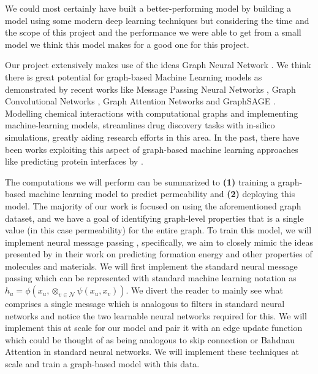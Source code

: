 \documentclass[fontsize=11pt]{article}
\begin{document}
We could most certainly have built a better-performing model by building a model using some modern deep learning techniques but considering the time and the scope of this project and the performance we were able to get from a small model we think this model makes for a good one for this project.



Our project extensively makes use of the ideas Graph Neural Network \citep{4700287}. We think there is great potential for graph-based Machine Learning models as demonstrated by recent works like Message Passing Neural Networks \citep{gilmer2017neural}, Graph Convolutional Networks \citep{https://doi.org/10.48550/arxiv.1609.02907}, Graph Attention Networks \citep{https://doi.org/10.48550/arxiv.1710.10903} and GraphSAGE \citep{hamilton2017inductive}. Modelling chemical interactions with computational graphs and implementing machine-learning models, streamlines drug discovery tasks with in-silico simulations, greatly aiding research efforts in this area. In the past, there have been works exploiting this aspect of graph-based machine learning approaches like predicting protein interfaces by \cite{fout2017protein}.

The computations we will perform can be summarized to \textbf{(1)} training a graph-based machine learning model to predict permeability and \textbf{(2)} deploying this model. The majority of our work is focused on using the aforementioned graph dataset, and we have a goal of identifying graph-level properties that is a single value (in this case permeability) for the entire graph. To train this model, we will implement neural message passing \citep{jorgensen2018neural, gilmer2017neural}, specifically, we aim to closely mimic the ideas presented by \cite{jorgensen2018neural} in their work on predicting formation energy and other properties of molecules and materials. We will first implement the standard neural message passing which can be represented with standard machine learning notation as $h_u = \phi (x_u,\otimes_{v \in \mathcal{N}} \psi(x_u,x_v))$. We divert the reader to mainly see what comprises a single message which is analogous to filters in standard neural networks and notice the two learnable neural networks required for this. We will implement this at scale for our model and pair it with an edge update function which could be thought of as being analogous to skip connection \citep{hochreiter1997long} or Bahdnau Attention \citep{chorowski2015attention} in standard neural networks. We will implement these techniques at scale and train a graph-based model with this data.
\end{document}
